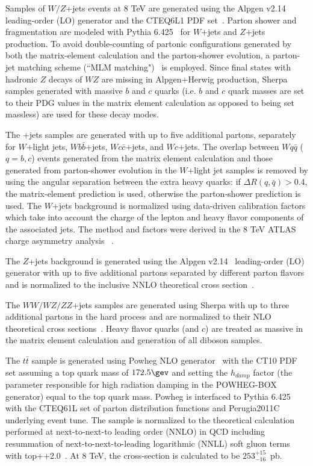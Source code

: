 Samples of $W/Z$+jets events at 8 TeV are generated using the {\sc Alpgen v2.14}~\cite{alpgen} leading-order (LO) generator and the {\sc CTEQ6L1} PDF set~\cite{cteq6}. Parton shower and fragmentation are modeled with {\sc Pythia} 6.425~\cite{Sjostrand:2006za} for $W$+jets and $Z$+jets production. To avoid double-counting of partonic configurations generated by both the matrix-element calculation and the parton-shower evolution, a parton-jet matching scheme (``MLM matching")~\cite{mlm} is employed. Since final states with hadronic $Z$ decays of $WZ$ are missing in {\sc Alpgen}+{\sc Herwig} production, {\sc Sherpa} samples generated with massive $b$ and $c$ quarks (i.e. $b$ and $c$ quark masses are set to their PDG values in the matrix element calculation as opposed to being set massless) are used for these decay modes.

The \w+jets samples are generated with up to five additional partons, separately for $W$+light jets, $Wb\bar{b}$+jets, $Wc\bar{c}$+jets, and $Wc$+jets. The overlap between $Wq\bar{q}$ ($q=b,c$) events generated from the matrix element calculation and those generated from parton-shower evolution in the $W$+light jet samples is removed by using the angular separation between the extra heavy quarks: if $\Delta R(q,\bar{q})>0.4$, the matrix-element prediction is used, otherwise the parton-shower prediction is used. The $W$+jets background is normalized using data-driven calibration factors which take into account the charge of the lepton and heavy flavor components of the associated jets. The method and factors were derived in the 8 TeV ATLAS \ttbar charge asymmetry analysis ~\cite{Juste:1647184}.

The $Z$+jets background is generated using the {\sc Alpgen v2.14}~\cite{alpgen} leading-order (LO) generator with up to five additional partons separated by different parton flavors and is normalized to the inclusive NNLO theoretical cross section~\cite{vjetsxs}.

The $WW/WZ/ZZ$+jets samples are generated using {\sc Sherpa} with up to three additional partons in the hard process and are normalized to their NLO theoretical cross sections~\cite{dibosonxs}. Heavy flavor quarks (\bt and $c$) are treated as massive in the matrix element calculation and generation of all diboson samples.

The $t\bar{t}$ sample is generated using {\sc Powheg} NLO generator~\cite{powheg,powbox1,powbox2} with the {\sc CT10} PDF set assuming a top quark mass of $172.5\gev$ and setting the $h_{damp}$ factor (the parameter responsible for high \pt radiation damping in the {\sc POWHEG-BOX} generator) equal to the top quark mass. {\sc Powheg} is interfaced to {\sc Pythia} 6.425~\cite{Sjostrand:2006za} with the {\sc CTEQ61L} set of parton distribution functions and Perugia2011C underlying event tune. The sample is normalized to the theoretical calculation performed at next-to-next-to leading order (NNLO) in QCD including resummation of next-to-next-to-leading logarithmic (NNLL) soft gluon terms with top++2.0~\cite{ref:xs1,ref:xs2,ref:xs3,ref:xs4,ref:xs5,Czakon:2011xx}. At 8 TeV, the \ttbar cross-section is calculated to be $253^{+15}_{-16}$~pb. 

